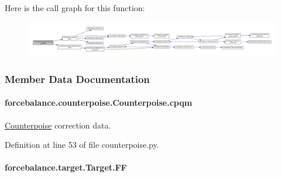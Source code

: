 Here is the call graph for this function\-:\nopagebreak
\begin{figure}[H]
\begin{center}
\leavevmode
\includegraphics[width=350pt]{classforcebalance_1_1target_1_1Target_af6099ec09486213869dba2491bd8ea04_cgraph}
\end{center}
\end{figure}




\subsubsection{Member Data Documentation}
\hypertarget{classforcebalance_1_1counterpoise_1_1Counterpoise_a55fa01e66b9171055b8d8a754a39997a}{
\paragraph[{cpqm}]{\setlength{\rightskip}{0pt plus 5cm}forcebalance.\-counterpoise.\-Counterpoise.\-cpqm}}\label{classforcebalance_1_1counterpoise_1_1Counterpoise_a55fa01e66b9171055b8d8a754a39997a}


\hyperlink{classforcebalance_1_1counterpoise_1_1Counterpoise}{Counterpoise} correction data. 



Definition at line 53 of file counterpoise.\-py.

\hypertarget{classforcebalance_1_1target_1_1Target_a38a37919783141ea37fdcf8b00ce0aaf}{
\paragraph[{F\-F}]{\setlength{\rightskip}{0pt plus 5cm}forcebalance.\-target.\-Target.\-F\-F\hspace{0.3cm}{\ttfamily [inherited]}}}\label{classforcebalance_1_1target_1_1Target_a38a37919783141ea37fdcf8b00ce0aaf}


